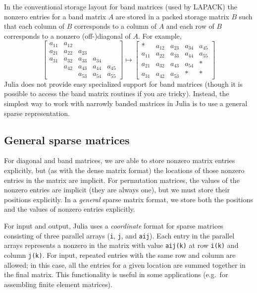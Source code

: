 \documentclass[12pt, leqno]{article} %
\begin{document}
In the conventional storage layout for band matrices (used by LAPACK)
the nonzero entries for a band matrix $A$ are stored in a packed
storage matrix $B$ such that each column of $B$ corresponds to a column
of $A$ and each row of $B$ corresponds to a nonzero (off-)diagonal of $A$.
For example,
\[
  \begin{bmatrix}
    a_{11} & a_{12} \\
    a_{21} & a_{22} & a_{23} \\
    a_{31} & a_{32} & a_{33} & a_{34} \\
    & a_{42} & a_{43} & a_{44} & a_{45} \\
    & & a_{53} & a_{54} & a_{55}
  \end{bmatrix} \mapsto
  \begin{bmatrix}
    * & a_{12} & a_{23} & a_{34} & a_{45} \\
    a_{11} & a_{22} & a_{33} & a_{44} & a_{55} \\
    a_{21} & a_{32} & a_{43} & a_{54} & * \\
    a_{31} & a_{42} & a_{53} & * & *
  \end{bmatrix}
\]
Julia does not provide easy specialized support for band matrices
(though it is possible to access the band matrix routines if you
are tricky).  Instead, the simplest way to work with narrowly banded
matrices in Julia is to use a general sparse representation.

\subsection{General sparse matrices}

For diagonal and band matrices, we are able to store nonzero matrix
entries explicitly, but (as with the dense matrix format) the locations
of those nonzero entries in the matrix are implicit.  For permutation
matrices, the values of the nonzero entries are implicit (they are
always one), but we must store their positions explicitly.  In a
{\em general} sparse matrix format, we store both the positions and
the values of nonzero entries explicitly.

For input and output, Julia uses a {\em coordinate} format for
sparse matrices consisting of three parallel arrays ({\tt i}, {\tt j},
and {\tt aij}).  Each entry in the parallel arrays represents a
nonzero in the matrix with value {\tt aij(k)} at row {\tt i(k)} and
column {\tt j(k)}.  For input, repeated entries with the same row and
column are allowed; in this case, all the entries for a given location
are summed together in the final matrix.
This functionality is useful
in some applications (e.g.~for assembling finite element matrices).
\end{document}

